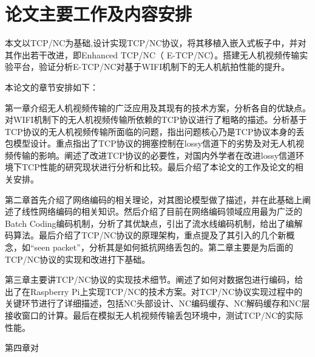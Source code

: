 \section{论文主要工作及内容安排}
本文以TCP/NC\textsuperscript{\cite{Sundararajan2009}}为基础,设计实现TCP/NC协议，将其移植入嵌入式板子中，并对其作出若干改进，即Enhanced TCP/NC（ E-TCP/NC）。搭建无人机视频传输实验平台，验证分析E-TCP/NC对基于WIFI机制下的无人机航拍性能的提升。
\par
本论文的章节安排如下：
\par
第一章介绍无人机视频传输的广泛应用及其现有的技术方案，分析各自的优缺点。对WIFI机制下的无人机视频传输所依赖的TCP协议进行了粗略的描述。分析基于TCP协议的无人机视频传输所面临的问题，指出问题核心乃是TCP协议本身的丢包模型设计。重点指出了TCP协议的拥塞控制在lossy信道下的劣势及对无人机视频传输的影响。阐述了改进TCP协议的必要性，对国内外学者在改进lossy信道环境下TCP性能的研究现状进行分析和比较。最后介绍了本论文的工作及论文的相关安排。
\par
第二章首先介绍了网络编码的相关理论，对其图论模型做了描述，并在此基础上阐述了线性网络编码的相关知识。然后介绍了目前在网络编码领域应用最为广泛的Batch Coding编码机制，分析了其优缺点，引出了流水线编码机制，给出了编解码算法。最后介绍了TCP/NC协议的原理架构，重点提及了其引入的几个新概念，如“seen packet”，分析其是如何抵抗网络丢包的。第二章主要是为后面的TCP/NC协议的实现和改进打下基础。 
\par
第三章主要讲TCP/NC协议的实现技术细节。阐述了如何对数据包进行编码，给出了在Raspberry Pi上实现TCP/NC的技术方案。对TCP/NC协议实现过程中的关键环节进行了详细描述，包括NC头部设计、NC编码缓存、NC解码缓存和NC层接收窗口的计算。最后在模拟无人机视频传输丢包环境中，测试TCP/NC的实际性能。
\par
第四章对


